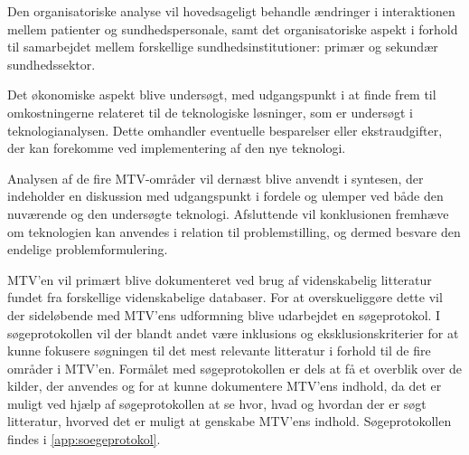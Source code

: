 Den organisatoriske analyse vil hovedsageligt behandle ændringer i interaktionen mellem patienter og sundhedspersonale, samt det organisatoriske aspekt i forhold til samarbejdet mellem forskellige sundhedsinstitutioner: primær og sekundær sundhedssektor.

Det økonomiske aspekt blive undersøgt, med udgangspunkt i at finde frem til omkostningerne relateret til de teknologiske løsninger, som er undersøgt i teknologianalysen. 
Dette omhandler eventuelle besparelser eller ekstraudgifter, der kan forekomme ved implementering af den nye teknologi.

Analysen af de fire MTV-områder vil dernæst blive anvendt i syntesen, der indeholder en diskussion med udgangspunkt i fordele og ulemper ved både den nuværende og den undersøgte teknologi. 
Afsluttende vil konklusionen fremhæve om teknologien kan anvendes i relation til problemstilling, og dermed besvare den endelige problemformulering.

MTV’en vil primært blive dokumenteret ved brug af videnskabelig litteratur fundet fra forskellige videnskabelige databaser. For at overskueliggøre dette vil der sideløbende med MTV’ens udformning blive udarbejdet en søgeprotokol. I søgeprotokollen vil der blandt andet være inklusions og eksklusionskriterier for at kunne fokusere søgningen til det mest relevante litteratur i forhold til de fire områder i MTV’en. Formålet med søgeprotokollen er dels at få et overblik over de kilder, der anvendes og for at kunne dokumentere MTV’ens indhold, da det er muligt ved hjælp af søgeprotokollen at se hvor, hvad og hvordan der er søgt litteratur, hvorved det er muligt at genskabe MTV’ens indhold. Søgeprotokollen findes i \autoref{app:soegeprotokol}.





